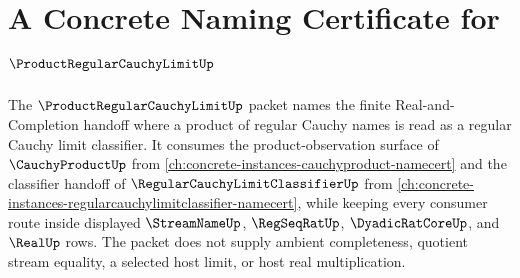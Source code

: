 \chapter{A Concrete Naming Certificate for $\ProductRegularCauchyLimitUp$}
\label{ch:concrete-instances-productregularcauchylimit-namecert}

The $\ProductRegularCauchyLimitUp$ packet names the finite Real-and-Completion handoff where a product of regular Cauchy names is read as a regular Cauchy limit classifier. It consumes the product-observation surface of $\CauchyProductUp$ from \autoref{ch:concrete-instances-cauchyproduct-namecert} and the classifier handoff of $\RegularCauchyLimitClassifierUp$ from \autoref{ch:concrete-instances-regularcauchylimitclassifier-namecert}, while keeping every consumer route inside displayed $\StreamNameUp$, $\RegSeqRatUp$, $\DyadicRatCoreUp$, and $\RealUp$ rows. The packet does not supply ambient completeness, quotient stream equality, a selected host limit, or host real multiplication.


